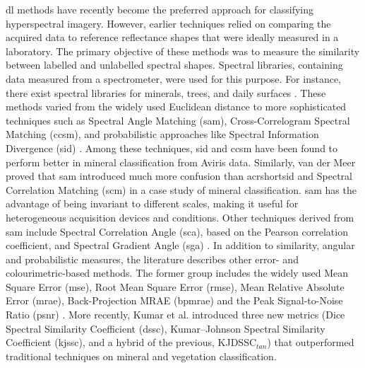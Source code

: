 \acrshort{dl} methods have recently become the preferred approach for classifying hyperspectral imagery. However, earlier techniques relied on comparing the acquired data to reference reflectance shapes that were ideally measured in a laboratory. The primary objective of these methods was to measure the similarity between labelled and unlabelled spectral shapes. Spectral libraries, containing data measured from a spectrometer, were used for this purpose. For instance, there exist spectral libraries for minerals, trees, and daily surfaces \cite{kokaly_usgs_2017, dutta_characterizing_2017, matusik_data-driven_2003}. These methods varied from the widely used Euclidean distance to more sophisticated techniques such as Spectral Angle Matching (\acrshort{sam}), Cross-Correlogram Spectral Matching (\acrshort{ccsm}), and probabilistic approaches like Spectral Information Divergence (\acrshort{sid}) \cite{pu_hyperspectral_2017}. Among these techniques, \acrshort{sid} and \acrshort{ccsm} have been found to perform better in mineral classification from Aviris data. Similarly, van der Meer \cite{van_der_meer_effectiveness_2006} proved that \acrshort{sam} introduced much more confusion than acrshort{sid} and Spectral Correlation Matching (\acrshort{scm}) in a case study of mineral classification. \acrshort{sam} has the advantage of being invariant to different scales, making it useful for heterogeneous acquisition devices and conditions. Other techniques derived from \acrshort{sam} include Spectral Correlation Angle (\acrshort{sca}), based on the Pearson correlation coefficient, and Spectral Gradient Angle (\acrshort{sga}) \cite{ren_novel_2022}. In addition to similarity, angular and probabilistic measures, the literature describes other error- and colourimetric-based methods. The former group includes the widely used Mean Square Error (\acrshort{mse}), Root Mean Square Error (\acrshort{rmse}), Mean Relative Absolute Error (\acrshort{mrae}), Back-Projection MRAE (\acrshort{bpmrae}) and the Peak Signal-to-Noise Ratio (\acrshort{psnr}) \cite{agarla_analysis_2021}. More recently, Kumar et al. \cite{kumar_new_2021} introduced three new metrics (Dice Spectral Similarity Coefficient (\acrshort{dssc}), Kumar–Johnson Spectral Similarity Coefficient (\acrshort{kjssc}), and a hybrid of the previous, KJDSSC$_{\textit{tan}}$) that outperformed traditional techniques on mineral and vegetation classification.

